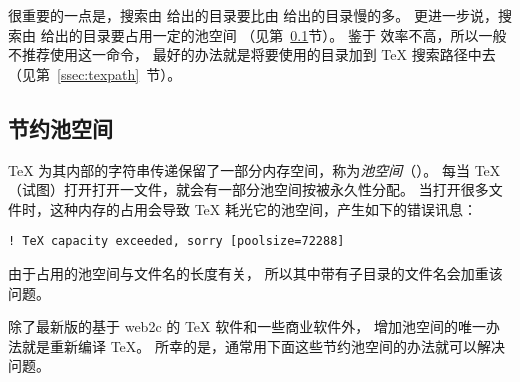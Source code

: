 很重要的一点是，搜索由  给出的目录要比由  给出的目录慢的多。
更进一步说，搜索由  给出的目录要占用一定的池空间
（见第~\ref{ssec:poolspace}节）。
鉴于  效率不高，所以一般不推荐使用这一命令，
最好的办法就是将要使用的目录加到 \TeX{} 搜索路径中去（见第~\ref{ssec:texpath}~节）。


\subsection{节约池空间}\label{ssec:poolspace}

\TeX{} 为其内部的字符串传递保留了一部分内存空间，称为\emph{池空间}（）。
每当 \TeX{} （试图）打开打开一文件，就会有一部分池空间按被永久性分配。
当打开很多文件时，这种内存的占用会导致 \TeX{} 耗光它的池空间，产生如下的错误讯息：
\begin{Verbatim}[xleftmargin=1cm]
! TeX capacity exceeded, sorry [poolsize=72288]
\end{Verbatim}

由于占用的池空间与文件名的长度有关，
所以其中带有子目录的文件名会加重该问题。

除了最新版的基于 web2c 的 \TeX{} 软件和一些商业软件外，
增加池空间的唯一办法就是重新编译 \TeX{}。
所幸的是，通常用下面这些节约池空间的办法就可以解决问题。

